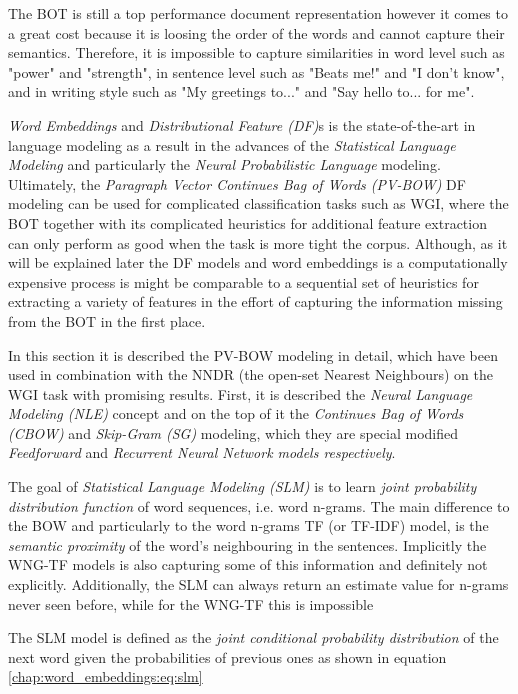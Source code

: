 The BOT is still a top performance document representation however it comes to a great cost because it is loosing the order of the words and cannot capture their semantics. Therefore, it is impossible to capture similarities in word level such as "power" and "strength", in sentence level such as "Beats me!" and "I don't know", and in writing style such as "My greetings to..." and "Say hello to... for me". 

\textit{Word Embeddings} and \textit{Distributional Feature (DF)}s is the state-of-the-art in language modeling as a result in the advances of the \textit{Statistical Language Modeling} and particularly the \textit{Neural Probabilistic Language} modeling. Ultimately, the \textit{Paragraph Vector Continues Bag of Words (PV-BOW)} DF modeling can be used for complicated classification tasks such as WGI, where the BOT together with its complicated heuristics for additional feature extraction can only perform as good when the task is more tight the corpus. Although, as it will be explained later the DF models and word embeddings is a computationally expensive process is might be comparable to a sequential set of heuristics for extracting a variety of features in the effort of capturing the information missing from the BOT in the first place.  

In this section it is described the PV-BOW modeling in detail, which have been used in combination with the NNDR (the open-set Nearest Neighbours) on the WGI task with promising results. First, it is described the \textit{Neural Language Modeling (NLE)} concept and on the top of it the \textit{Continues Bag of Words  (CBOW)} and  \textit{Skip-Gram (SG)} modeling, which they are special modified \textit{Feedforward} and \textit{Recurrent Neural Network models respectively}.

The goal of \textit{Statistical Language Modeling (SLM) } is to learn \textit{joint probability distribution function} of word sequences, i.e. word n-grams. The main difference to the BOW and particularly to the word n-grams TF (or TF-IDF) model, is the \textit{semantic proximity} of the word's neighbouring in the sentences. Implicitly the WNG-TF models is also capturing some of this information and definitely not explicitly. Additionally, the SLM can always return an estimate value for n-grams never seen before, while for the WNG-TF this is impossible  \parencite{bengio2003neural}

The SLM model is defined as the \textit{joint conditional probability distribution} of the next word given the probabilities of previous ones as shown in equation \ref{chap:word_embeddings:eq:slm}

